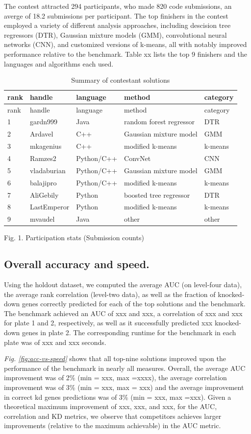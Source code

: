 \documentclass[]{article}
\begin{document}
The contest attracted 294 participants, who made 820 code submissions,
an averge of 18.2 submissions per participant. The top finishers in the
contest employed a variety of different analysis approaches, including
descision tree regressors (DTR), Gaussian mixture models (GMM),
convolutional neural networks (CNN), and customized versions of k-means,
all with notably improved performance relative to the benchmark. Table
xx lists the top 9 finishers and the languages and algorithms each used.

\begin{longtable}[]{@{}lllll@{}}
\caption{Summary of contestant solutions}\tabularnewline
\toprule
rank & handle & language & method & category\tabularnewline
\midrule
\endfirsthead
\toprule
rank & handle & language & method & category\tabularnewline
\midrule
\endhead
1 & gardn999 & Java & random forest regressor & DTR\tabularnewline
2 & Ardavel & C++ & Gaussian mixture model & GMM\tabularnewline
3 & mkagenius & C++ & modified k-means & k-means\tabularnewline
4 & Ramzes2 & Python/C++ & ConvNet & CNN\tabularnewline
5 & vladaburian & Python/C++ & Gaussian mixture model &
GMM\tabularnewline
6 & balajipro & Python/C++ & modified k-means & k-means\tabularnewline
7 & AliGebily & Python & boosted tree regressor & DTR\tabularnewline
8 & LastEmperor & Python & modified k-means & k-means\tabularnewline
9 & mvaudel & Java & other & other\tabularnewline
\bottomrule
\end{longtable}

Fig. 1. Participation stats (Submission counts)

\hypertarget{overall-accuracy-and-speed.}{%
\subsection{Overall accuracy and
speed.}\label{overall-accuracy-and-speed.}}

Using the holdout dataset, we computed the average AUC (on level-four
data), the average rank correlation (level-two data), as well as the
fraction of knocked-down genes correctly predicted for each of the top
solutions and the benchmark. The benchmark achieved an AUC of xxx and
xxx, a correlation of xxx and xxx for plate 1 and 2, respectively, as
well as it successfully predicted xxx knocked-down genes in plate 2. The
corresponding runtime for the benchmark in each plate was of xxx and xxx
seconds.

{\it Fig. \ref{fig:acc-vs-speed}} shows that all top-nine solutions
improved upon the performance of the benchmark in nearly all measures.
Overall, the average AUC improvement was of 2\% (min = xxx, max =xxxx),
the average correlation improvement was of 3\% (min = xxx, max = xxx)
and the average improvement in correct kd genes predictions was of 3\%
(min = xxx, max =xxx). Given a theoretical maximum improvement of xxx,
xxx, and xxx, for the AUC, correlation and KD metrics, we observe that
competitors achieves larger improvements (relative to the maximum
achievable) in the AUC metric.
\end{document}
